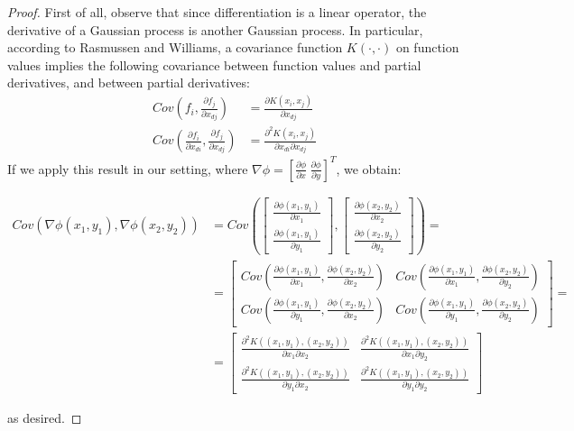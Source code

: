 \documentclass[11pt,a4paper]{article}
\begin{document}
\begin{proof}
First of all, observe that since differentiation is a linear operator, the derivative of a Gaussian process is another Gaussian process. In particular, according to Rasmussen and Williams, a covariance function $K(\cdot, \cdot)$ on function values implies the following covariance between function values and partial derivatives, and between partial derivatives:
\begin{align*}
    \textit{Cov}\left(f_i, \frac{\partial f_j}{\partial x_{dj}}\right) &= \frac{\partial K(x_i, x_j)}{\partial x_{dj}} \\
    \textit{Cov}\left(\frac{\partial f_i}{\partial x_{di}}, \frac{\partial f_j}{\partial x_{dj}}\right) &= \frac{\partial^2 K(x_i, x_j)}{\partial x_{di}\partial x_{dj}} 
\end{align*}
If we apply this result in our setting, where $\nabla \phi = \left[ \frac{\partial \phi}{\partial x} \hspace{3pt} \frac{\partial \phi}{\partial y}  \right]^T$, we obtain:

\begin{align*}
    \textit{Cov}(\nabla \phi (x_1, y_1), \nabla \phi (x_2, y_2)) &= \textit{Cov} \left( 
    \begin{bmatrix}
    \frac{\partial \phi (x_1, y_1)}{\partial x_1} \\ \frac{\partial \phi (x_1, y_1)}{\partial y_1}
    \end{bmatrix}, 
    \begin{bmatrix}
    \frac{\partial \phi (x_2, y_2)}{\partial x_2} \\ \frac{\partial \phi (x_2, y_2)}{\partial y_2}
    \end{bmatrix}
    \right) = \\
    &= 
    \begin{bmatrix}
    \textit{Cov} \left( \frac{\partial \phi (x_1, y_1)}{\partial x_1}, \frac{\partial \phi (x_2, y_2)}{\partial x_2} \right) & \textit{Cov} \left( \frac{\partial \phi (x_1, y_1)}{\partial x_1}, \frac{\partial \phi (x_2, y_2)}{\partial y_2} \right) \\
    \textit{Cov} \left( \frac{\partial \phi (x_1, y_1)}{\partial y_1}, \frac{\partial \phi (x_2, y_2)}{\partial x_2} \right) & \textit{Cov} \left( \frac{\partial \phi (x_1, y_1)}{\partial y_1}, \frac{\partial \phi (x_2, y_2)}{\partial y_2} \right)
    \end{bmatrix} = \\
    &= 
    \begin{bmatrix}
    \frac{\partial^2 K((x_1,y_1), (x_2,y_2))}{\partial x_1 \partial x_2} & \frac{\partial^2 K((x_1,y_1), (x_2,y_2))}{\partial x_1 \partial y_2}\\
    \frac{\partial^2 K((x_1,y_1), (x_2,y_2))}{\partial y_1 \partial x_2} & \frac{\partial^2 K((x_1,y_1), (x_2,y_2))}{\partial y_1 \partial y_2}
\end{bmatrix}
\end{align*}

as desired. 
\end{proof}
\end{document}
